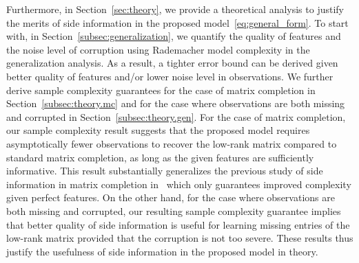 \documentclass[twoside,11pt]{article}
\begin{document}
Furthermore, in Section~\ref{sec:theory}, we provide a theoretical analysis to
justify the merits of side information in the proposed model~\eqref{eq:general_form}.
To start with, in Section~\ref{subsec:generalization},
we quantify the quality of features and the noise level
of corruption using Rademacher model complexity in the generalization analysis.  As a result,
a tighter error bound can be derived given better quality of features and/or lower
noise level in observations.  We further derive sample complexity
guarantees for the case of matrix completion in Section~\ref{subsec:theory.mc}
and for the case where observations are both
missing and corrupted in Section~\ref{subsec:theory.gen}.  For the case of matrix completion,
our sample complexity result suggests that
the proposed model requires asymptotically fewer observations to recover the
low-rank matrix compared to standard matrix completion, as long as
the given features are sufficiently informative.
This result substantially generalizes the previous study of side information
in matrix completion in~\citet{Jain13b} which only guarantees improved complexity given
perfect features.  On the other hand, for the case where observations are both
missing and corrupted, our resulting sample complexity guarantee implies that
better quality of side information
is useful for learning missing entries of the low-rank matrix provided that the corruption
is not too severe.   These results thus justify the usefulness of
side information in the proposed model in theory.

\end{document}
